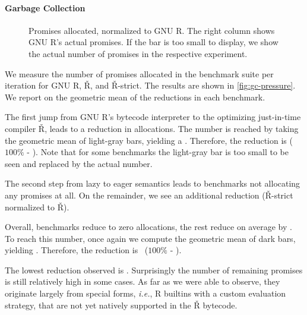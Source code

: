 \documentclass[review,creen,acmsmall]{acmart}
\renewcommand{\Rsh}{{\sf\v R}\xspace}
\newcommand{\Rshstrict}{{\sf\v R-strict}\xspace}
\newcommand{\ie}{\emph{i.e.},\xspace}
\begin{document}
\paragraph{Garbage Collection}

\begin{figure}[h]
  \centering
  
  \caption{Promises allocated, normalized to GNU R. The right column shows GNU R's actual promises. If the bar is too small to display, we show the actual number of promises in the respective experiment.}
  \label{fig:gc-pressure}
\end{figure}

We measure the number of promises allocated in the
benchmark suite per iteration for GNU R, \Rsh, and \Rsh-strict. The results are shown in
\autoref{fig:gc-pressure}. We report on the geometric mean of the reductions in each benchmark.

The first jump from GNU R's bytecode interpreter to the optimizing just-in-time compiler \Rsh,
leads to a \promiseAlocationReductionGnurRsh reduction in allocations. The number is reached by taking
the geometric mean of light-gray bars, yielding a \promiseAllocationGnurRsh. Therefore, the reduction
is \promiseAlocationReductionGnurRsh ({$100\%$\xspace} - \promiseAllocationGnurRsh).
Note that for some benchmarks the light-gray bar is too small to be seen and replaced by the actual number.

The second step from lazy to eager semantics leads to \promiseAlocationReductionRshStrictToZero
benchmarks not allocating any promises at all. On the remainder, we see an additional
\promiseAlocationReductionRshStrict reduction (\Rshstrict normalized to \Rsh).

Overall, \promiseAlocationReductionRshStrictToZero benchmarks reduce to zero
allocations, the rest reduce on average by \promiseAlocationReductionGnurRshStrict. To reach this number,
once again we compute the geometric mean of dark bars, yielding \promiseAllocatioGnurRshStrict. Therefore, the reduction is ~\promiseAlocationReductionGnurRshStrict ({$100\%$\xspace} -  \promiseAllocatioGnurRshStrict).

The lowest reduction observed is \promiseAlocationReductionGnurRshStrictMin. Surprisingly the number of remaining promises is
still relatively high in some cases. As far as we were able to observe, they
originate largely from special forms, \ie R builtins with a custom evaluation
strategy, that are not yet natively supported in the \Rsh bytecode.
\end{document}
